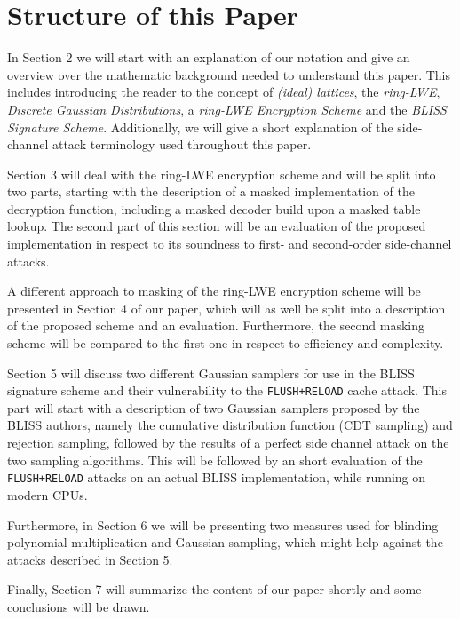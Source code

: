 \section{Structure of this Paper}
In Section 2 we will start with an explanation of our notation and give an overview over the mathematic background needed to understand this paper. This includes introducing the reader to the concept of \textit{(ideal) lattices}, the \textit{\ac{ring-LWE}}, \textit{Discrete Gaussian Distributions}, a \textit{\ac{ring-LWE} Encryption Scheme} and the \textit{BLISS Signature Scheme}. Additionally, we will give a short explanation of the side-channel attack terminology used throughout this paper.

Section 3 will deal with the ring-LWE encryption scheme and will be split into two parts, starting with the description of a masked implementation of the decryption function, including a masked decoder build upon a masked table lookup. The second part of this section will be an evaluation of the proposed implementation in respect to its soundness to first- and second-order side-channel attacks.

A different approach to masking of the \ac{ring-LWE} encryption scheme will be presented in Section 4 of our paper, which will as well be split into a description of the proposed scheme and an evaluation. Furthermore, the second masking scheme will be compared to the first one in respect to efficiency and complexity.

Section 5 will discuss two different Gaussian samplers for use in the BLISS signature scheme and their vulnerability to the \verb|FLUSH+RELOAD| cache attack. This part will start with a description of two Gaussian samplers proposed by the BLISS authors, namely the cumulative distribution function (CDT sampling) and rejection sampling, followed by the results of a perfect side channel attack on the two sampling algorithms. This will be followed by an short evaluation of the \verb|FLUSH+RELOAD| attacks on an actual BLISS implementation, while running on modern CPUs.

Furthermore, in Section 6 we will be presenting two measures used for blinding polynomial multiplication and Gaussian sampling, which might help against the attacks described in Section 5.

Finally, Section 7 will summarize the content of our paper shortly and some conclusions will be drawn.